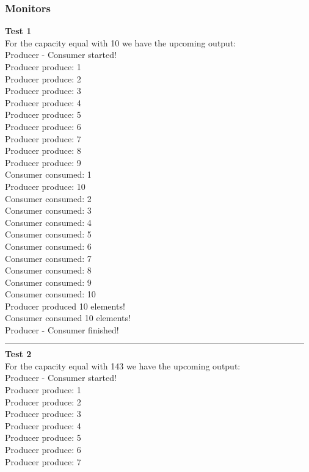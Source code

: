 \documentclass[14pt]{article}
\begin{document}
\subsubsection{Monitors}
\textbf{Test 1}
\\For the capacity equal with 10 we have the upcoming output:
\\Producer - Consumer started!
\\Producer produce: 1
\\Producer produce: 2
\\Producer produce: 3
\\Producer produce: 4
\\Producer produce: 5
\\Producer produce: 6
\\Producer produce: 7
\\Producer produce: 8
\\Producer produce: 9
\\Consumer consumed: 1
\\Producer produce: 10
\\Consumer consumed: 2
\\Consumer consumed: 3
\\Consumer consumed: 4
\\Consumer consumed: 5
\\Consumer consumed: 6
\\Consumer consumed: 7
\\Consumer consumed: 8
\\Consumer consumed: 9
\\Consumer consumed: 10
\\Producer produced 10 elements!
\\Consumer consumed 10 elements!
\\Producer - Consumer finished!
\\---------------------------------------------------------------------------------------------------------
\\\textbf{Test 2}
\\For the capacity equal with 143 we have the upcoming output:
\\Producer - Consumer started!
\\Producer produce: 1
\\Producer produce: 2
\\Producer produce: 3
\\Producer produce: 4
\\Producer produce: 5
\\Producer produce: 6
\\Producer produce: 7
\end{document}
